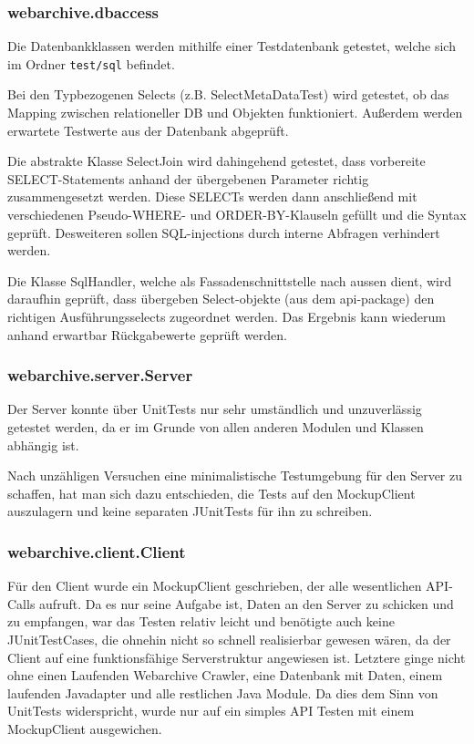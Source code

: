	\subsubsection{webarchive.dbaccess}
		Die Datenbankklassen werden mithilfe einer Testdatenbank getestet, welche sich im Ordner \lstinline{test/sql} befindet.

		Bei den Typbezogenen Selects (z.B. SelectMetaDataTest) wird getestet, 
		ob das Mapping zwischen relationeller DB und Objekten funktioniert.
		Außerdem werden erwartete Testwerte aus der Datenbank abgeprüft.
		
		Die abstrakte Klasse SelectJoin wird dahingehend getestet, 
		dass vorbereite SELECT-Statements anhand der übergebenen Parameter richtig zusammengesetzt werden.
		Diese SELECTs werden dann anschließend mit verschiedenen Pseudo-WHERE- und ORDER-BY-Klauseln gefüllt
		und die Syntax geprüft.
		Desweiteren sollen SQL-injections durch interne Abfragen verhindert werden.

		Die Klasse SqlHandler, welche als Fassadenschnittstelle nach aussen dient, wird daraufhin
		geprüft, dass übergeben Select-objekte (aus dem api-package) den richtigen Ausführungsselects zugeordnet werden. Das Ergebnis kann wiederum anhand erwartbar Rückgabewerte geprüft werden.
	\subsubsection{webarchive.server.Server}
		Der Server konnte über UnitTests nur sehr umständlich und unzuverlässig getestet werden, da er im Grunde von allen anderen Modulen und Klassen abhängig ist.
		
		Nach unzähligen Versuchen eine minimalistische Testumgebung für den Server zu schaffen, hat man sich dazu entschieden, die Tests auf den MockupClient auszulagern und keine separaten JUnitTests für ihn zu schreiben.
	\subsubsection{webarchive.client.Client}
		Für den Client wurde ein MockupClient geschrieben, der alle wesentlichen API-Calls aufruft. 
		Da es nur seine Aufgabe ist, Daten an den Server zu schicken und zu empfangen, war das Testen relativ leicht und benötigte auch keine JUnitTestCases, die ohnehin nicht so schnell realisierbar gewesen wären, da der Client auf eine funktionsfähige Serverstruktur angewiesen ist.
		Letztere ginge nicht ohne einen Laufenden Webarchive Crawler, eine Datenbank mit Daten, einem laufenden Javadapter und alle restlichen Java Module.
		Da dies dem Sinn von UnitTests widerspricht, wurde nur auf ein simples API Testen mit einem MockupClient ausgewichen.
